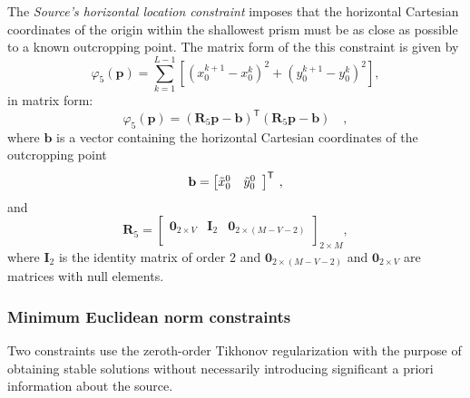 The \textit{Source's horizontal location constraint} imposes that the horizontal Cartesian coordinates of the origin within 
the shallowest prism must be as close as possible to a known outcropping point. The matrix form of the this constraint is given by
\begin{equation}\label{eq:phi5}
\varphi_{5}(\textbf{p}) = \sum\limits^{L-1}_{k=1}\left[\left(x_{0}^{k+1} - x_{0}^{k}\right)^2 + \left(y_{0}^{k+1} - y_{0}^{k}\right)^2 \right] ,
\end{equation}
in matrix form:
\begin{equation}
\varphi_{5}(\mathbf{p}) = \left(\mathbf{R}_{5} \mathbf{p} - \mathbf{b} \right)^{\mathsf{T}}
\left(\mathbf{R}_{5} \mathbf{p} - \mathbf{b}\right) \quad ,
\end{equation}
where $\mathbf{b}$ is a vector containing the horizontal Cartesian coordinates of the outcropping point 
\begin{equation}
\mathbf{b} = \left[ \begin{array}{@{}*{12}{c}@{}}
\tilde{x}_{0}^{0} & \tilde{y}_{0}^{0} \\
\end{array} \right]^{\mathsf{T}} \: ,
\label{eq:b-vector}
\end{equation}
and
\begin{equation}
\mathbf{R}_{5} = 
\begin{bmatrix}
\mathbf{0}_{2 \times V} & \mathbf{I}_{2} & \mathbf{0}_{2 \times (M-V-2)} \\
\end{bmatrix}_{2 \times M},
\label{eq:R5-matrix}
\end{equation}
where $\mathbf{I}_{2}$ is the identity matrix of order $2$ and $\mathbf{0}_{2 \times (M-V-2)}$ and 
$\mathbf{0}_{2 \times V}$ are matrices with null elements.

\subsubsection{Minimum Euclidean norm constraints}

Two constraints use the zeroth-order Tikhonov regularization with the purpose of obtaining stable solutions without necessarily introducing significant a priori information about the source. 

